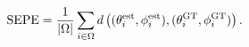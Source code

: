 %
\begin{equation}\label{equ:exp:epesph}
	\text{SEPE} = \frac{1}{|\Omega|} \sum_{i \in \Omega} d\left( (\theta^\text{est}_i, \phi^\text{est}_i), (\theta^\text{GT}_i, \phi^\text{GT}_i)\right)
	\text{.}
\end{equation}





